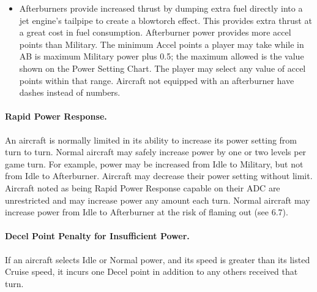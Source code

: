 {\begin{itemize}
    \item{} Afterburners provide increased thrust by dumping extra fuel directly into a jet engine's tailpipe to create a blowtorch effect. This provides extra thrust at a great cost in fuel consumption. Afterburner power provides more accel points than Military. The minimum Accel points a player may take while in AB is maximum Military power plus 0.5; the maximum allowed is the value shown on the Power Setting Chart. The player may select any value of accel points within that range. Aircraft not equipped with an afterburner have dashes instead of numbers.

\end{itemize}

\paragraph{Rapid Power Response.} An aircraft is normally limited in its ability to increase its power setting from turn to turn. Normal aircraft may safely increase power by one or two levels per game turn. For example, power may be increased from Idle to Military, but not from Idle to Afterburner. Aircraft may decrease their power setting without limit. Aircraft noted as being Rapid Power Response capable on their ADC are unrestricted and may increase power any amount each turn. Normal aircraft may increase power from Idle to Afterburner at the risk of flaming out (see 6.7).

\paragraph{Decel Point Penalty for Insufficient Power.} If an aircraft selects Idle or Normal power, and its speed is greater than its listed Cruise speed, it incurs one Decel point in addition to any others received that turn.
}

\label{rule:acceleration-and-deceleration-points}
\label{rule:speed-change}


